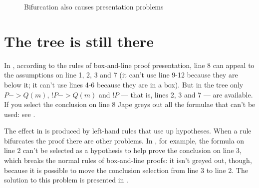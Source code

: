 \begin{figure}
\centering
{}
\qquad
{}
\caption{Bifurcation also causes presentation problems}
\end{figure}

\section{The tree is still there}

In , according to the rules of box-and-line proof presentation, line 8 can appeal to the assumptions on line 1, 2, 3 and 7 (it can't use line 9-12 because they are below it; it can't use lines 4-6 because they are in a box). But in the tree only $P->Q(m)$, $!P->Q(m)$ and $!P$ --- that is, lines 2, 3 and 7 --- are available. If you select the conclusion on line 8 Jape greys out all the formulae that can't be used: see .

The effect in  is produced by left-hand rules that use up hypotheses. When a rule bifurcates the proof there are other problems. In , for example, the formula on line 2 can't be selected as a hypothesis to help prove the conclusion on line 3, which breaks the normal rules of box-and-line proofs: it isn't greyed out, though, because it is possible to move the conclusion selection from line 3 to line 2. The solution to this problem is presented in .


